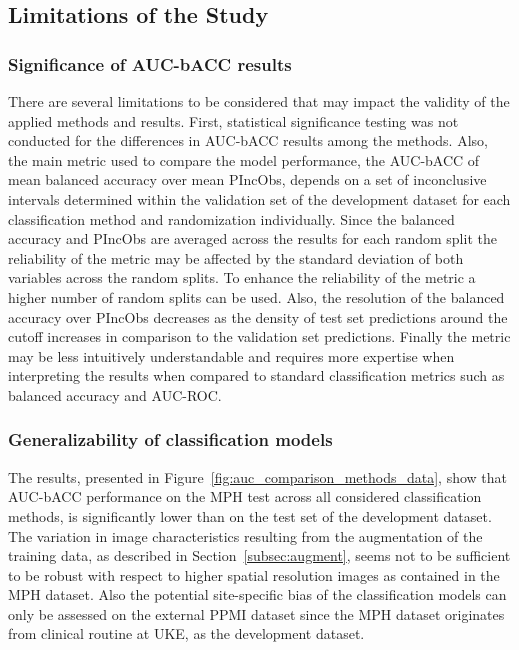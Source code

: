 


\subsection{Limitations of the Study}

\subsubsection{Significance of AUC-bACC results}

There are several limitations to be considered that may impact the validity of the applied methods and results.
First, statistical significance testing was not conducted for the differences in AUC-bACC results among the methods.
Also, the main metric used to compare the model performance, the AUC-bACC of mean balanced accuracy over mean PIncObs, 
depends on a set of inconclusive intervals determined within the validation set of the development dataset 
for each classification method and randomization individually.
Since the balanced accuracy and PIncObs are averaged across the results for each random split 
the reliability of the metric may be affected by the standard deviation of both variables across the random splits.
To enhance the reliability of the metric a higher number of random splits can be used.
Also, the resolution of the balanced accuracy over PIncObs decreases as the density of test set 
predictions around the cutoff increases in comparison to the validation set predictions.
Finally the metric may be less intuitively understandable and requires more expertise when interpreting the results
when compared to standard classification metrics such as balanced accuracy and AUC-ROC.


\subsubsection{Generalizability of classification models}

The results, presented in Figure~\ref{fig:auc_comparison_methods_data}, 
show that AUC-bACC performance on the MPH test across all considered classification methods, 
is significantly lower than on the test set of the development dataset.
The variation in image characteristics resulting from the augmentation of the training data,
as described in Section~\ref{subsec:augment}, seems not to be sufficient to be robust 
with respect to higher spatial resolution images as contained in the MPH dataset.
Also the potential site-specific bias of the classification models can only be assessed 
on the external PPMI dataset 
since the MPH dataset originates from clinical routine at UKE, as the development dataset.


